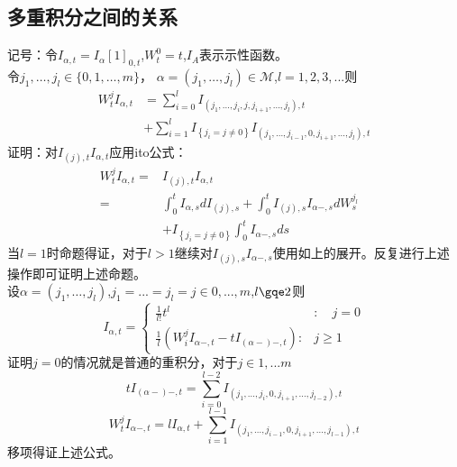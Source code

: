 \documentclass{article}%
\begin{document}
\subsection{多重积分之间的关系}
记号：令$I_{\alpha,t}=I_{\alpha}[1]_{0,t}$,$W_t^0=t$,$I_A$表示示性函数。\\
令$j_{1}, \ldots, j_{l} \in\{0,1, \ldots, m\}$， $\alpha=\left(j_{1}, \ldots, j_{l}\right) \in\mathcal{M}$,$l=1,2,3,...$则
\begin{equation}
\begin{aligned}
W_{t}^{j} I_{\alpha, t}&=\sum_{i=0}^{l} I_{\left(j_{1}, \ldots, j_{i}, j, j_{i+1}, \ldots, j_{l}\right), t} \\
&+\sum_{i=1}^{l} I_{\left\{j_{i}=j \neq 0\right\}} I_{\left(j_{1}, \ldots, j_{i-1}, 0, j_{i+1}, \ldots, j_{l}\right), t}
\end{aligned}
\end{equation}
证明：对$I_{(j),t}I_{\alpha,t}$应用ito公式：
\begin{equation}
\begin{aligned}
W_{t}^{j} I_{\alpha, t}=& I_{(j), t} I_{\alpha, t} \\
=& \int_{0}^{t} I_{\alpha, s} d I_{(j), s}+\int_{0}^{t} I_{(j), s} I_{\alpha-, s} d W_{s}^{j_{l}} \\
&+I_{\left\{j_{i}=j \neq 0\right\}} \int_{0}^{t} I_{\alpha-, s} d s &
\end{aligned}
\end{equation}
当$l=1$时命题得证，对于$l>1$继续对$I_{(j),s}I_{\alpha-,s}$使用如上的展开。反复进行上述操作即可证明上述命题。\\
设$\alpha=\left(j_{1}, \ldots, j_{l}\right)$,$j_1=...=j_l=j\in {0,...,m}$,$l\gqe 2$则
\begin{equation}
I_{\alpha, t}=\left\{\begin{array}{ll}
\frac{1}{l!}t^{l} & : \quad j=0 \\
\frac{1}{l}\left(W_{i}^{j} I_{\alpha-, t}-t I_{(\alpha-)-, t}\right): & j \geq 1
\end{array}\right.
\end{equation}
证明$j=0$的情况就是普通的重积分，对于$j\in {1,...m}$
\begin{equation}
t I_{(\alpha-)-, t}=\sum_{i=0}^{l-2} I_{\left(j_{1}, \dots, j_{i}, 0, j_{i+1}, \dots, j_{l-2}\right), t}
\end{equation}
\begin{equation}
W_{t}^{j} I_{\alpha-, t}=l I_{\alpha, t}+\sum_{i=1}^{l-1} I_{\left(j_{1}, \dots, j_{i-1}, 0, j_{i+1}, \dots, j_{l-1}\right), t}
\end{equation}
移项得证上述公式。
\end{document}
